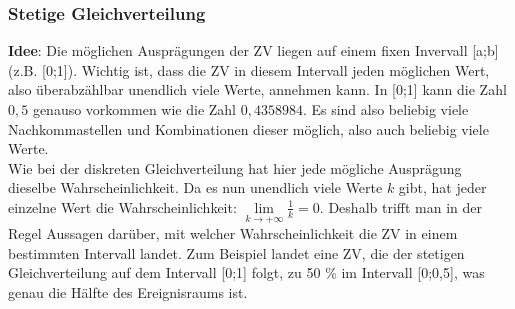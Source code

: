 \documentclass[a4paper]{article}
\begin{document}
\subsubsection{Stetige Gleichverteilung}\label{sec:Uni}

\textbf{Idee}: Die möglichen Ausprägungen der ZV liegen auf einem fixen Invervall [a;b] (z.B. [0;1]). Wichtig ist, dass die ZV in diesem Intervall jeden möglichen Wert, also überabzählbar unendlich viele Werte, annehmen kann. In [0;1] kann die Zahl $0,5$ genauso vorkommen wie die Zahl $0,4358984$. Es sind also beliebig viele Nachkommastellen und Kombinationen dieser möglich, also auch beliebig viele Werte. \\

\noindent Wie bei der diskreten Gleichverteilung hat hier jede mögliche Ausprägung dieselbe Wahrscheinlichkeit. Da es nun unendlich viele Werte $k$ gibt, hat jeder einzelne Wert die Wahrscheinlichkeit: $\lim\limits_{k \rightarrow +\infty}{\frac{1}{k}}=0$. Deshalb trifft man in der Regel Aussagen darüber, mit welcher Wahrscheinlichkeit die ZV in einem bestimmten Intervall landet. Zum Beispiel landet eine ZV, die der stetigen Gleichverteilung auf dem Intervall [0;1] folgt, zu 50 \% im Intervall [0;0,5], was genau die Hälfte des Ereignisraums ist.
\end{document}
